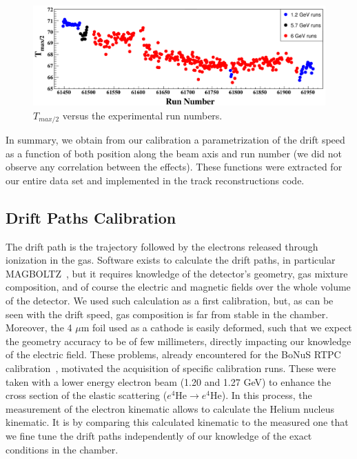 \documentclass[twocolumn,showpacs,superscriptaddress,groupedaddress]{revtex4}
\begin{document}
\begin{figure}[tb]
\centering
\includegraphics[width=16.5cm]{fig_2017/Drift_run_number.pdf}
\caption{$T_{max/2}$ versus the experimental run numbers.} 
\label{fig:Drift_run_number_1}
\end{figure}


In summary, we obtain from our calibration a parametrization of the drift speed 
as a function of both position along the beam axis and run number (we did not 
observe any correlation between the effects). These 
functions were extracted for our entire data set and implemented in the 
track reconstructions code.
   
\subsection{Drift Paths Calibration}

The drift path is the trajectory followed by the electrons released through 
ionization in the gas. Software exists to calculate the drift paths, in particular
MAGBOLTZ~\cite{MAGBOLTZ}, but it requires knowledge of the detector's 
geometry, gas mixture composition, and of course the electric and magnetic 
fields over the whole volume of the detector. We used such calculation as a 
first calibration, but, 
as can be seen with the drift speed, gas composition is far from stable in the 
chamber. Moreover, the 4 $\mu$m foil used as a cathode is easily deformed, such
that we expect the geometry accuracy to be of few millimeters, directly impacting 
our knowledge of the electric field. These problems, already 
encountered for the BoNuS RTPC calibration~\cite{BONUS-NIM}, motivated the 
acquisition of specific calibration runs. These were taken with a lower energy 
electron beam (1.20 and 1.27 GeV) to enhance the cross section of the elastic 
scattering ($e^{4}$He$\rightarrow e^{4}$He). In this process, the measurement of
the electron kinematic allows to calculate the Helium nucleus kinematic. It is
by comparing this calculated kinematic to the measured one that we fine tune
the drift paths independently of our knowledge of the exact conditions in the 
chamber.
\end{document}
